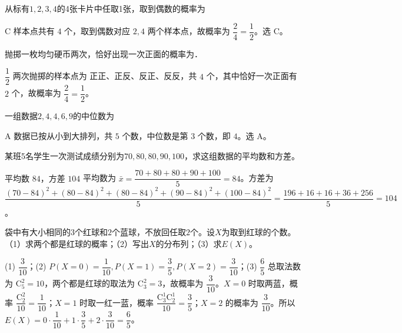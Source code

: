 \begin{question}[GPT生成]
从标有$1,2,3,4$的4张卡片中任取1张，取到偶数的概率为\choiceBox
{}
\end{question}
\begin{answer}{C}
样本点共有 $4$ 个，取到偶数对应 $2,4$ 两个样本点，故概率为 $\dfrac24=\dfrac12$。选 C。
\end{answer}


\begin{question}[GPT生成]
抛掷一枚均匀硬币两次，恰好出现一次正面的概率为\blank{3cm}．
\end{question}
\begin{answer}{$\dfrac12$}
两次抛掷的样本点为 正正、正反、反正、反反，共 $4$ 个，其中恰好一次正面有 $2$ 个，故概率为 $\dfrac24=\dfrac12$。
\end{answer}



\begin{question}[GPT生成]
一组数据$2,4,4,6,9$的中位数为\choiceBox
{}
\end{question}
\begin{answer}{A}
数据已按从小到大排列，共 $5$ 个数，中位数是第 $3$ 个数，即 $4$。选 A。
\end{answer}


\begin{question}[GPT生成]
某班5名学生一次测试成绩分别为$70,80,80,90,100$，求这组数据的平均数和方差。
\end{question}
\begin{answer}{平均数 $84$，方差 $104$}
平均数为 $\bar x=\dfrac{70+80+80+90+100}{5}=84$。方差为 $\dfrac{(70-84)^2+(80-84)^2+(80-84)^2+(90-84)^2+(100-84)^2}{5}=\dfrac{196+16+16+36+256}{5}=104$。
\end{answer}



\begin{question}[GPT生成]
袋中有大小相同的$3$个红球和$2$个蓝球，不放回任取$2$个。设$X$为取到红球的个数。（1）求两个都是红球的概率；（2）写出$X$的分布列；（3）求$E(X)$。
\end{question}
\solutionSpace{5cm}
\begin{answer}{(1) $\dfrac3{10}$；(2) $P(X=0)=\dfrac1{10},P(X=1)=\dfrac35,P(X=2)=\dfrac3{10}$；(3) $\dfrac65$}
总取法数为 $\mathrm{C}_5^2=10$，两个都是红球的取法为 $\mathrm{C}_3^2=3$，故概率为 $\dfrac3{10}$。$X=0$ 时取两蓝，概率 $\dfrac{\mathrm{C}_2^2}{10}=\dfrac1{10}$；$X=1$ 时取一红一蓝，概率 $\dfrac{\mathrm{C}_3^1\mathrm{C}_2^1}{10}=\dfrac35$；$X=2$ 的概率为 $\dfrac3{10}$。所以 $E(X)=0\cdot\dfrac1{10}+1\cdot\dfrac35+2\cdot\dfrac3{10}=\dfrac65$。
\end{answer}

